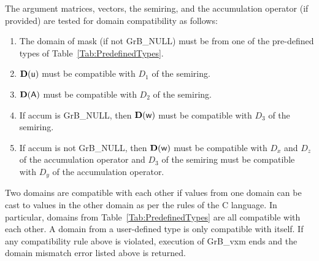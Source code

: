 The argument matrices, vectors, the semiring, and the accumulation operator (if provided) 
are tested for domain compatibility as follows:
\begin{enumerate}
	\item The domain of {\sf mask} (if not {\sf GrB\_NULL}) must be from one of the pre-defined types of Table~\ref{Tab:PredefinedTypes}.

	\item $\bold{D}({\sf u})$ must be compatible with $D_1$ of the semiring.

	\item $\bold{D}({\sf A})$ must be compatible with $D_2$ of the semiring.

	\item If {\sf accum} is {\sf GrB\_NULL}, then $\bold{D}({\sf w})$ must be compatible with $D_3$ of the semiring.

	\item If {\sf accum} is not {\sf GrB\_NULL}, then $\bold{D}({\sf w})$ must be compatible with $D_x$ and $D_z$ of the 
	accumulation operator and $D_3$ of the semiring must be compatible with $D_y$ of the accumulation operator.
\end{enumerate}
Two domains are compatible with each other if values from one domain can be cast 
to values in the other domain as per the rules of the C language.
In particular, domains from Table~\ref{Tab:PredefinedTypes} are all compatible 
with each other. A domain from a user-defined type is only compatible with itself.
If any compatibility rule above is violated, execution of {\sf GrB\_vxm} ends and 
the domain mismatch error listed above is returned.

